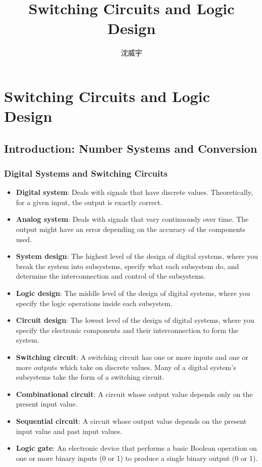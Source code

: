 \documentclass[a4paper,12pt]{report}
\begin{document}
\title{Switching Circuits and Logic Design}
\author{沈威宇}
\date{\temtoday}
\titletocdoc
\chapter{Switching Circuits and Logic Design}
\section{Introduction: Number Systems and Conversion}
\subsection{Digital Systems and Switching Circuits}
\begin{itemize}
\item\textbf{Digital system}: Deals with signals that have discrete values. Theoretically, for a given input, the output is exactly correct.
\item\textbf{Analog system}: Deals with signals that vary continuously over time. The output might have an error depending on the accuracy of the components used.
\item\textbf{System design}: The highest level of the design of digital systems, where you break the system into subsystems, specify what each subsystem do, and determine the interconnection and control of the subsystems.
\item\textbf{Logic design}: The middle level of the design of digital systems, where you specify the logic operations inside each subsystem.
\item\textbf{Circuit design}: The lowest level of the design of digital systems, where you specify the electronic components and their interconnection to form the system.
\item\textbf{Switching circuit}: A switching circuit has one or more inputs and one or more outputs which take on discrete values. Many of a digital system’s subsystems take the form of a switching circuit.
\item\textbf{Combinational circuit}: A circuit whose output value depends only on the present input value.
\item\textbf{Sequential circuit}: A circuit whose output value depends on the present input value and past input values.
\item\textbf{Logic gate}: An electronic device that performs a basic Boolean operation on one or more binary inputs (0 or 1) to produce a single binary output (0 or 1).
\end{itemize}
\end{document}
